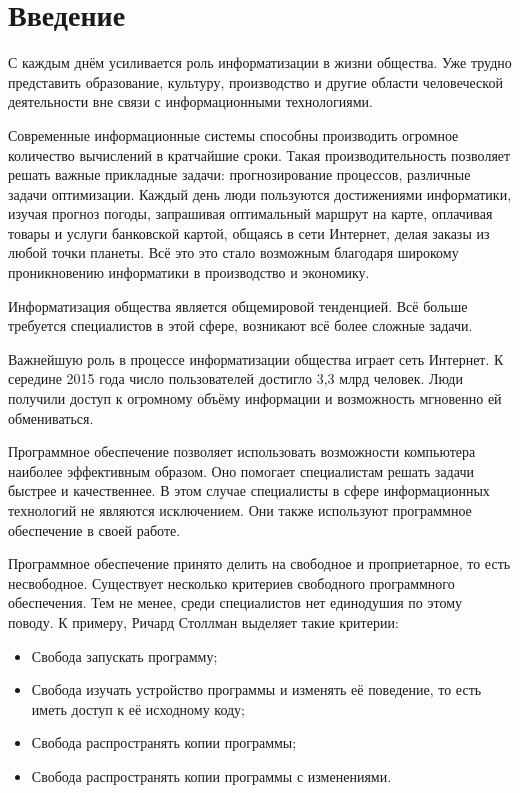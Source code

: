 \documentclass[fontsize=14pt, paper=a4, pagesize, DIV=calc]{scrartcl}
\begin{document}
\setcounter{page}{2}

\tableofcontents

\newpage

\section*{Введение}

С каждым днём усиливается роль информатизации в жизни общества. Уже трудно
представить образование, культуру, производство и другие области человеческой
деятельности вне связи с информационными технологиями. 

Современные информационные системы способны производить огромное количество
вычислений в кратчайшие сроки. Такая производительность позволяет решать важные
прикладные задачи: прогнозирование процессов, различные задачи оптимизации.
Каждый день люди пользуются достижениями информатики, изучая прогноз погоды,
запрашивая оптимальный маршрут на карте, оплачивая товары и услуги банковской
картой, общаясь в сети Интернет, делая заказы из любой точки планеты. Всё это
это стало возможным благодаря широкому проникновению информатики в производство
и экономику.

Информатизация общества является общемировой тенденцией. Всё больше требуется 
специалистов в этой сфере, возникают всё более сложные задачи.

Важнейшую роль в процессе информатизации общества играет сеть Интернет. К
середине 2015 года число пользователей достигло 3,3 млрд человек. Люди получили
доступ к огромному объёму информации и возможность мгновенно ей обмениваться.

Программное обеспечение позволяет использовать возможности компьютера наиболее
эффективным образом. Оно помогает специалистам решать задачи быстрее и
качественнее. В этом случае специалисты в сфере информационных технологий не
являются исключением. Они также используют программное обеспечение в своей
работе.

Программное обеспечение принято делить на свободное и проприетарное, то есть
несвободное. Существует несколько критериев свободного программного обеспечения.
Тем не менее, среди специалистов нет единодушия по этому поводу. К примеру, 
Ричард Столлман выделяет такие критерии:

\begin{itemize}
\item Свобода запускать программу;
\item Свобода изучать устройство программы и изменять её поведение, то есть
иметь доступ к её исходному коду;
\item Свобода распространять копии программы;
\item Свобода распространять копии программы с изменениями.
\end{itemize}
\end{document}
